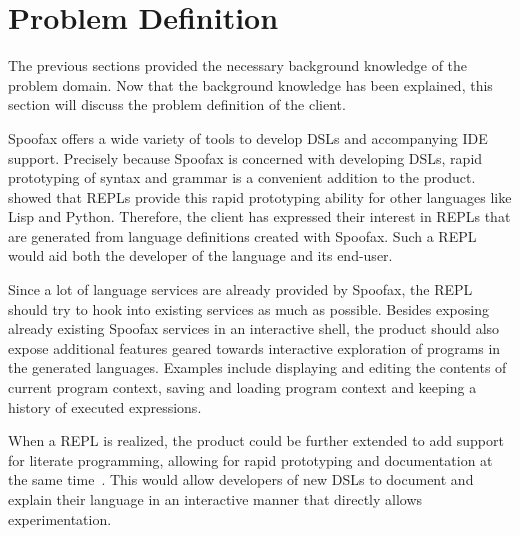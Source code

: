 \section{Problem Definition}
\label{sec:problem-definition}

The previous sections provided the necessary background knowledge of
the problem domain. Now that the background knowledge has been
explained, this section will discuss the problem definition of the
client.

Spoofax offers a wide variety of tools to develop DSLs and
accompanying IDE support. Precisely because Spoofax is concerned with
developing DSLs, rapid prototyping of syntax and grammar is a
convenient addition to the product.  showed that REPLs
provide this rapid prototyping ability for other languages like Lisp
and Python. Therefore, the client has expressed their interest in
REPLs that are generated from language definitions created with
Spoofax. Such a REPL would aid both the developer of the language and
its end-user.

Since a lot of language services are already provided by Spoofax, the
REPL should try to hook into existing services as much as possible.
Besides exposing already existing Spoofax services in an interactive
shell, the product should also expose additional features geared
towards interactive exploration of programs in the generated
languages.  Examples include displaying and editing the contents of
current program context, saving and loading program context and
keeping a history of executed expressions.

When a REPL is realized, the product could be further extended to add
support for literate programming, allowing for rapid prototyping and
documentation at the same time~\cite{schulte2012}. This would allow
developers of new DSLs to document and explain their language in an
interactive manner that directly allows experimentation.

